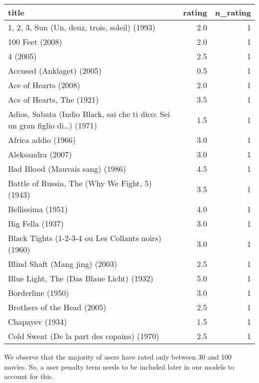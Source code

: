 \documentclass[
]{article}
\newenvironment{Shaded}{\begin{snugshade}}{\end{snugshade}}
\newcommand{\CommentTok}[1]{\textcolor[rgb]{0.00,0.40,1.00}{\textbf{\textit{#1}}}}
\newcommand{\DataTypeTok}[1]{\textcolor[rgb]{0.74,0.68,0.62}{\underline{#1}}}
\newcommand{\DecValTok}[1]{\textcolor[rgb]{0.27,0.67,0.26}{#1}}
\newcommand{\KeywordTok}[1]{\textcolor[rgb]{0.26,0.66,0.93}{\textbf{#1}}}
\newcommand{\NormalTok}[1]{\textcolor[rgb]{0.74,0.68,0.62}{#1}}
\newcommand{\OperatorTok}[1]{\textcolor[rgb]{0.74,0.68,0.62}{#1}}
\newcommand{\StringTok}[1]{\textcolor[rgb]{0.02,0.61,0.04}{#1}}
\begin{document}
\begin{longtable}[]{@{}lrr@{}}
\toprule
title & rating & n\_rating\tabularnewline
\midrule
\endhead
1, 2, 3, Sun (Un, deuz, trois, soleil) (1993) & 2.0 & 1\tabularnewline
100 Feet (2008) & 2.0 & 1\tabularnewline
4 (2005) & 2.5 & 1\tabularnewline
Accused (Anklaget) (2005) & 0.5 & 1\tabularnewline
Ace of Hearts (2008) & 2.0 & 1\tabularnewline
Ace of Hearts, The (1921) & 3.5 & 1\tabularnewline
Adios, Sabata (Indio Black, sai che ti dico: Sei un gran figlio
di\ldots) (1971) & 1.5 & 1\tabularnewline
Africa addio (1966) & 3.0 & 1\tabularnewline
Aleksandra (2007) & 3.0 & 1\tabularnewline
Bad Blood (Mauvais sang) (1986) & 4.5 & 1\tabularnewline
Battle of Russia, The (Why We Fight, 5) (1943) & 3.5 & 1\tabularnewline
Bellissima (1951) & 4.0 & 1\tabularnewline
Big Fella (1937) & 3.0 & 1\tabularnewline
Black Tights (1-2-3-4 ou Les Collants noirs) (1960) & 3.0 &
1\tabularnewline
Blind Shaft (Mang jing) (2003) & 2.5 & 1\tabularnewline
Blue Light, The (Das Blaue Licht) (1932) & 5.0 & 1\tabularnewline
Borderline (1950) & 3.0 & 1\tabularnewline
Brothers of the Head (2005) & 2.5 & 1\tabularnewline
Chapayev (1934) & 1.5 & 1\tabularnewline
Cold Sweat (De la part des copains) (1970) & 2.5 & 1\tabularnewline
\bottomrule
\end{longtable}

\pagebreak

We observe that the majority of users have rated only between 30 and 100
movies. So, a user penalty term needs to be included later in our models
to account for this.

\begin{Shaded}
\end{Shaded}
\end{document}
